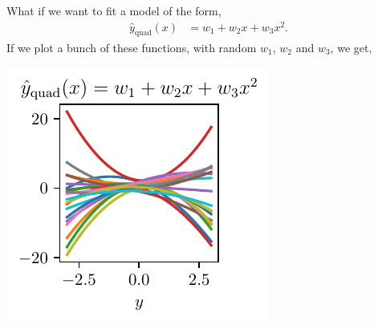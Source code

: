 \documentclass{article}
\newcommand{\yh}{\hat{y}}
\begin{document}
What if we want to fit a model of the form,
\begin{align}
  \label{eq:quad}
  \yh_\text{quad}(x) &= w_1 + w_2 x + w_3 x^2.
\end{align}
If we plot a bunch of these functions, with random $w_1$, $w_2$ and $w_3$, we get,
\begin{center}
\includegraphics{quad_fam.pdf}
\end{center}
\end{document}

